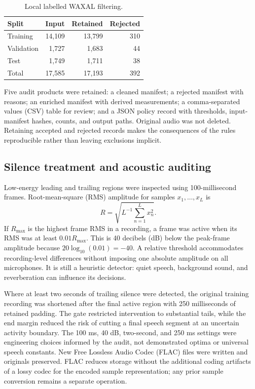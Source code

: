 \documentclass[12pt,a4paper]{report}
\begin{document}
\begin{table}[htbp]\centering
\caption{Local labelled WAXAL filtering.}\label{tab:cleaning}
\begin{tabular}{lrrr}\toprule Split & Input & Retained & Rejected\\\midrule
Training & 14,109 & 13,799 & 310\\
Validation & 1,727 & 1,683 & 44\\
Test & 1,749 & 1,711 & 38\\\midrule
Total & 17,585 & 17,193 & 392\\\bottomrule
\end{tabular}\end{table}

Five audit products were retained: a cleaned manifest; a rejected manifest with reasons; an enriched manifest with derived measurements; a comma-separated values (CSV) table for review; and a JSON policy record with thresholds, input-manifest hashes, counts, and output paths. Original audio was not deleted. Retaining accepted and rejected records makes the consequences of the rules reproducible rather than leaving exclusions implicit.

\subsection{Silence treatment and acoustic auditing}

Low-energy leading and trailing regions were inspected using 100-millisecond frames. Root-mean-square (RMS) amplitude for samples $x_1,\ldots,x_L$ is
\begin{equation}R=\sqrt{L^{-1}\sum_{n=1}^{L}x_n^2}.\end{equation}
If $R_{\max}$ is the highest frame RMS in a recording, a frame was active when its RMS was at least $0.01R_{\max}$. This is 40 decibels (dB) below the peak-frame amplitude because $20\log_{10}(0.01)=-40$. A relative threshold accommodates recording-level differences without imposing one absolute amplitude on all microphones. It is still a heuristic detector: quiet speech, background sound, and reverberation can influence its decisions.

Where at least two seconds of trailing silence were detected, the original training recording was shortened after the final active region with 250 milliseconds of retained padding. The gate restricted intervention to substantial tails, while the end margin reduced the risk of cutting a final speech segment at an uncertain activity boundary. The 100 ms, 40 dB, two-second, and 250 ms settings were engineering choices informed by the audit, not demonstrated optima or universal speech constants. New Free Lossless Audio Codec (FLAC) files were written and originals preserved. FLAC reduces storage without the additional coding artifacts of a lossy codec for the encoded sample representation; any prior sample conversion remains a separate operation.
\end{document}
